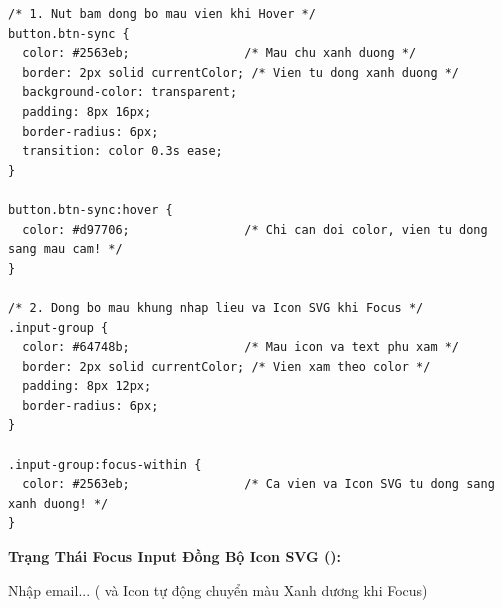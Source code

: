 \begin{codeWindow}
\begin{lstlisting}[language=CSS3]
/* 1. Nut bam dong bo mau vien khi Hover */
button.btn-sync {
  color: #2563eb;                /* Mau chu xanh duong */
  border: 2px solid currentColor; /* Vien tu dong xanh duong */
  background-color: transparent;
  padding: 8px 16px;
  border-radius: 6px;
  transition: color 0.3s ease;
}

button.btn-sync:hover {
  color: #d97706;                /* Chi can doi color, vien tu dong sang mau cam! */
}

/* 2. Dong bo mau khung nhap lieu va Icon SVG khi Focus */
.input-group {
  color: #64748b;                /* Mau icon va text phu xam */
  border: 2px solid currentColor; /* Vien xam theo color */
  padding: 8px 12px;
  border-radius: 6px;
}

.input-group:focus-within {
  color: #2563eb;                /* Ca vien va Icon SVG tu dong sang xanh duong! */
}
\end{lstlisting}
\end{codeWindow}

\begin{browserWindow}
\vspace{2pt}
\begin{tcolorbox}[
    enhanced,
    colback=white,
    colframe=gray!30,
    arc=6pt, boxrule=0.8pt,
    top=10pt, bottom=10pt, left=12pt, right=12pt
]
  {\sffamily\bfseries\color{primaryBlue} Trạng Thái Focus Input Đồng Bộ Icon SVG ():}\\[4pt]
  \begin{tcolorbox} \quad Nhập email... \quad ( và Icon tự động chuyển màu Xanh dương khi Focus)
  \end{tcolorbox}
\end{tcolorbox}
\end{browserWindow}

